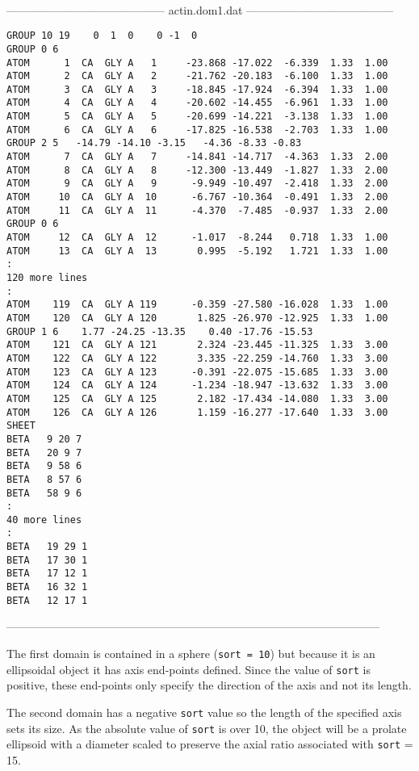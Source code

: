 \begin{singlespace}
\ \\
------------------------------------------
actin.dom1.dat
---------------------------------------
\begin{verbatim}
GROUP 10 19    0  1  0    0 -1  0
GROUP 0 6
ATOM      1  CA  GLY A   1     -23.868 -17.022  -6.339  1.33  1.00
ATOM      2  CA  GLY A   2     -21.762 -20.183  -6.100  1.33  1.00
ATOM      3  CA  GLY A   3     -18.845 -17.924  -6.394  1.33  1.00
ATOM      4  CA  GLY A   4     -20.602 -14.455  -6.961  1.33  1.00
ATOM      5  CA  GLY A   5     -20.699 -14.221  -3.138  1.33  1.00
ATOM      6  CA  GLY A   6     -17.825 -16.538  -2.703  1.33  1.00
GROUP 2 5   -14.79 -14.10 -3.15   -4.36 -8.33 -0.83
ATOM      7  CA  GLY A   7     -14.841 -14.717  -4.363  1.33  2.00
ATOM      8  CA  GLY A   8     -12.300 -13.449  -1.827  1.33  2.00
ATOM      9  CA  GLY A   9      -9.949 -10.497  -2.418  1.33  2.00
ATOM     10  CA  GLY A  10      -6.767 -10.364  -0.491  1.33  2.00
ATOM     11  CA  GLY A  11      -4.370  -7.485  -0.937  1.33  2.00
GROUP 0 6
ATOM     12  CA  GLY A  12      -1.017  -8.244   0.718  1.33  1.00
ATOM     13  CA  GLY A  13       0.995  -5.192   1.721  1.33  1.00
:
120 more lines
:
ATOM    119  CA  GLY A 119      -0.359 -27.580 -16.028  1.33  1.00
ATOM    120  CA  GLY A 120       1.825 -26.970 -12.925  1.33  1.00
GROUP 1 6    1.77 -24.25 -13.35    0.40 -17.76 -15.53
ATOM    121  CA  GLY A 121       2.324 -23.445 -11.325  1.33  3.00
ATOM    122  CA  GLY A 122       3.335 -22.259 -14.760  1.33  3.00
ATOM    123  CA  GLY A 123      -0.391 -22.075 -15.685  1.33  3.00
ATOM    124  CA  GLY A 124      -1.234 -18.947 -13.632  1.33  3.00
ATOM    125  CA  GLY A 125       2.182 -17.434 -14.080  1.33  3.00
ATOM    126  CA  GLY A 126       1.159 -16.277 -17.640  1.33  3.00
SHEET
BETA   9 20 7
BETA   20 9 7
BETA   9 58 6
BETA   8 57 6
BETA   58 9 6
:
40 more lines
:
BETA   19 29 1
BETA   17 30 1
BETA   17 12 1
BETA   16 32 1
BETA   12 17 1
\end{verbatim}
---------------------------------------------------------------------------------------------------
\end{singlespace}

The first domain is contained in a sphere ({\tt sort = 10}) but because it is an ellipsoidal object
it has axis end-points defined.  Since the value of {\tt sort} is positive, these end-points only
specify the direction of the axis and not its length.

The second domain has a negative {\tt sort} value so the length of the specified axis sets its size.
As the absolute value of {\tt sort} is over 10, the object will be a prolate ellipsoid with a 
diameter scaled to preserve the axial ratio associated with {\tt sort} = 15.

